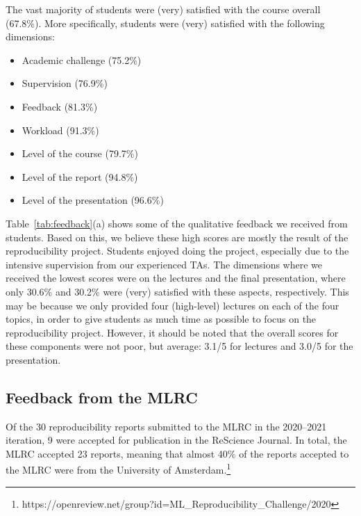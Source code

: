\documentclass[letterpaper]{article}
\newcommand{\OurUniversity}{the University of Amsterdam}
\begin{document}
The vast majority of students were (very) satisfied with the course overall (67.8\%). 
More specifically, students were (very) satisfied with the following dimensions: 
\begin{itemize}[leftmargin=*,nosep]
    \item Academic challenge (75.2\%)
    \item Supervision (76.9\%)
    \item Feedback (81.3\%)
    \item Workload (91.3\%)
    \item Level of the course (79.7\%)
    \item Level of the report (94.8\%)
    \item Level of the presentation (96.6\%)
\end{itemize}
Table~\ref{tab:feedback}(a) shows some of the qualitative feedback we received from students. 
Based on this, we believe these high scores are mostly the result of the reproducibility project. 
Students enjoyed doing the project, especially due to the intensive supervision from our experienced TAs. 
The dimensions where we received the lowest scores were on the lectures and the final presentation, where only 30.6\% and 30.2\% were (very) satisfied with these aspects, respectively. 
This may be because we only provided four (high-level) lectures on each of the four topics, in order to give students as much time as possible to focus on the reproducibility project. 
However, it should be noted that the overall scores for these components were not poor, but average: 3.1/5 for lectures and 3.0/5 for the presentation. 

\subsection{Feedback from the MLRC}
\label{section:feedback-mlrc}

Of the 30 reproducibility reports submitted to the MLRC in the 2020--2021 iteration, 9 were accepted for publication in the ReScience Journal.  
In total, the MLRC accepted 23 reports, meaning that almost 40\% of the reports accepted to the MLRC were from \OurUniversity{}.\footnote{https://openreview.net/group?id=ML\_Reproducibility\_Challenge/2020}
 
\end{document}
